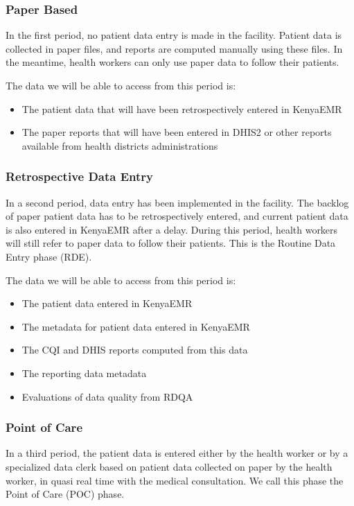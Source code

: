 \documentclass[a4paper,11pt,final,twoside]{article}
\begin{document}
        \subsubsection{Paper Based}

In the first period, no patient data entry is made in the facility. Patient data is collected in paper files, and reports are computed manually using these files. In the meantime, health workers can only use paper data to follow their patients.

The data we will be able to access from this period is:
\begin{itemize}
\item	The patient data that will have been retrospectively entered in KenyaEMR
\item	The paper reports that will have been entered in DHIS2 or other reports available from health districts administrations
\end{itemize}

        \subsubsection{Retrospective Data Entry}

In a second period, data entry has been implemented in the facility. The backlog of paper patient data has to be retrospectively entered, and current patient data is also entered in KenyaEMR after a delay. During this period, health workers will still refer to paper data to follow their patients. This is the Routine Data Entry phase (RDE).

The data we will be able to access from this period is:
\begin{itemize}
\item	The patient data entered in KenyaEMR
\item	The metadata for patient data entered in KenyaEMR
\item	The CQI and DHIS reports computed from this data
\item	The reporting data metadata
\item	Evaluations of data quality from RDQA
\end{itemize}

        \subsubsection{Point of Care}

In a third period, the patient data is entered either by the health worker or by a specialized data clerk based on patient data collected on paper by the health worker, in quasi real time with the medical consultation. We call this phase the Point of Care (POC) phase.
\end{document}
